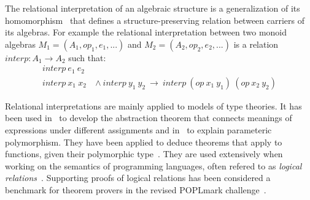 The relational interpretation of an algebraic structure is a generalization of its homomorphism~\cite{reynolds1983types} that defines a 
structure-preserving relation between carriers of its algebras. For example the relational interpretation between two monoid algebras $M_1 = (A_1,op_1,e_1,...)$ and $M_2 = (A_2,op_2,e_2,...)$ is a relation $interp : A_1 \to A_2$ such that: 
\begin{align*}
interp\ e_1\ e_2 &  \\
interp\ x_1\ x_2\ &\wedge\ interp\ y_1\ y_2\ \rightarrow\ interp\ (op\ x_1\ y_1)\ (op\ x_2\ y_2)  
\end{align*}


Relational interpretations are mainly applied to models of type theories. It has been used in~\cite{reynolds1983types} to develop the abstraction theorem that connects meanings of expressions under different assignments and in~\cite{parametricPoly93} to explain parameteric polymorphism. They have been applied to deduce theorems that apply to functions, given their polymorphic type~\cite{wadler1989theorems, algehed2020dynamic}. 
They are used extensively when working on the semantics of programming languages, often refered to as \emph{logical relations}~\cite{crary2005logical}. Supporting proofs of logical relations has been considered a benchmark for theorem provers in the revised POPLmark challenge~\cite{poplmark2019}.  





